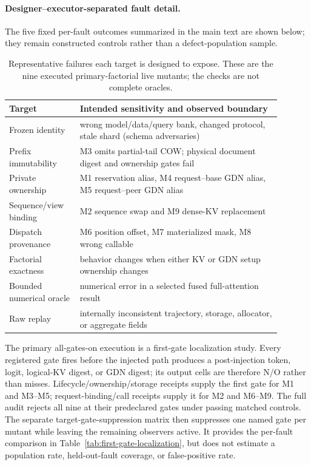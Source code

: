\documentclass{article}
\begin{document}
\paragraph{Designer--executor-separated fault detail.}
The five fixed per-fault outcomes summarized in the main text are shown below;
they remain constructed controls rather than a defect-population sample.


\begin{table}[H]
\caption{Representative failures each target is designed to expose.  These are
the nine executed primary-factorial live mutants; the checks are not complete oracles.}
\centering\small
\begin{tabular}{@{}p{0.23\linewidth}p{0.66\linewidth}@{}}
\toprule
Target & Intended sensitivity and observed boundary \\
\midrule
Frozen identity & wrong model/data/query bank, changed protocol, stale shard (schema adversaries)\\
Prefix immutability & M3 omits partial-tail COW; physical document digest and ownership gates fail\\
Private ownership & M1 reservation alias, M4 request--base GDN alias, M5 request--peer GDN alias\\
Sequence/view binding & M2 sequence swap and M9 dense-KV replacement\\
Dispatch provenance & M6 position offset, M7 materialized mask, M8 wrong callable\\
Factorial exactness & behavior changes when either KV or GDN setup ownership changes\\
Bounded numerical oracle & numerical error in a selected fused full-attention result\\
Raw replay & internally inconsistent trajectory, storage, allocator, or aggregate fields\\
\bottomrule
\end{tabular}
\end{table}

The primary all-gates-on execution is a first-gate localization study.  Every registered gate
fires before the injected path produces a post-injection token, logit,
logical-KV digest, or GDN digest; its output cells are therefore N/O rather
than misses.
Lifecycle/ownership/storage receipts supply the first gate for M1 and M3--M5;
request-binding/call receipts supply it for M2 and M6--M9.  The full audit
rejects all nine at their predeclared gates under passing matched controls.
The separate target-gate-suppression matrix then suppresses one named gate per mutant while leaving
the remaining observers active.  It provides the per-fault comparison in
Table~\ref{tab:first-gate-localization}, but does not estimate a population
rate, held-out-fault coverage, or false-positive rate.
\end{document}
